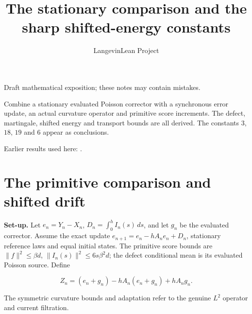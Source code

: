 \documentclass[11pt,a4paper]{article}
\title{\texorpdfstring{The stationary comparison and the sharp shifted-energy constants}{The stationary comparison and the sharp shifted-energy constants}}
\author{LangevinLean Project}
\date{}
\begin{document}
\maketitle
Draft mathematical exposition; these notes may contain mistakes.


Combine a stationary evaluated Poisson corrector with a synchronous error update, an actual curvature operator and primitive score increments. The defect, martingale, shifted energy and transport bounds are all derived. The constants \(3\), \(18\), \(19\) and \(6\) appear as conclusions.



Earlier results used here: \cite[Section~3.17]{LangevinLean2026ULASC}.

\section{\texorpdfstring{The primitive comparison and shifted drift}{The primitive comparison and shifted drift}}


\textbf{Set-up.} Let \(e_n=Y_n-X_n\), \(D_n=\int_0^h I_n(s)\,ds\), and let \(g_n\) be the evaluated corrector. Assume the exact update \(e_{n+1}=e_n-hA_ne_n+D_n\), stationary reference laws and equal initial states. The primitive score bounds are \(\|f\|^2\le\beta d\), \(\|I_n(s)\|^2\le6s\beta^2d\); the defect conditional mean is its evaluated Poisson source. Define

\[Z_n=(e_n+g_n)-hA_n(e_n+g_n)+hA_ng_n.\]

The symmetric curvature bounds and adaptation refer to the genuine \(L^2\) operator and current filtration.
\end{document}
